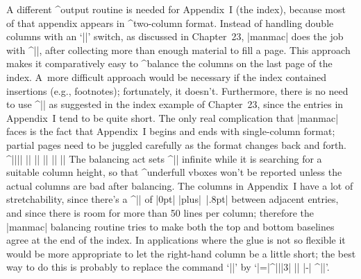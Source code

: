 A different ^{output routine} is needed for Appendix~I (the index), because
most of that appendix appears in ^{two-column format}. Instead of handling
double columns with an `|\lr|' switch, as discussed in Chapter~23,
|manmac| does the job with ^|\vsplit|, after collecting more than
enough material to fill a page. This approach makes it comparatively
easy to ^{balance the columns} on the last page of the index. A~more
difficult approach would be necessary if the index contained
insertions (e.g., footnotes); fortunately, it doesn't.
Furthermore, there is no need to use ^|\mark| as suggested in the
index example of Chapter~23, since the entries in Appendix~I tend to
be quite short. The only real complication that |manmac| faces
is the fact that Appendix~I begins and ends with single-column format;
partial pages need to be juggled carefully as the format changes back and forth.
\beginlines
^|\newbox||\partialpage|
|\def\begindoublecolumns{\begingroup|
|  \output={\global\setbox\partialpage=\vbox{\unvbox255\bigskip}}\eject|
|  \output={\doublecolumnout} |^|\hsize||=14pc |^|\vsize||=89pc}|
|\def\enddoublecolumns{\output={\balancecolumns}\eject|
|  \endgroup \pagegoal=\vsize}|
\smallbreak
|\def\doublecolumnout{\splittopskip=\topskip |^|\splitmaxdepth||=\maxdepth|
|  \dimen@=44pc \advance\dimen@ by-\ht\partialpage|
|  \setbox0=\vsplit255 to\dimen@ \setbox2=\vsplit255 to\dimen@|
|  \onepageout\pagesofar \unvbox255 \penalty|^|\outputpenalty||}|
|\def\pagesofar{\unvbox\partialpage|
|  |^|\wd||0=\hsize \wd2=\hsize \hbox to\pagewidth{\box0\hfil\box2}}|
|\def\balancecolumns{\setbox0=\vbox{\unvbox255} \dimen@=\ht0|
|  \advance\dimen@ by\topskip \advance\dimen@ by-\baselineskip|
|  |^|\divide||\dimen@ by2 |^|\splittopskip||=\topskip|
|  {\vbadness=10000 |^|\loop|| \global\setbox3=\copy0|
|    \global\setbox1=\vsplit3 to\dimen@|
|    |^|\ifdim|^|\ht||3>\dimen@ \global\advance\dimen@ by1pt \repeat}|
|  \setbox0=\vbox to\dimen@{\unvbox1} \setbox2=\vbox to\dimen@{\unvbox3}|
|  \pagesofar}|
\endlines
The balancing act sets ^|\vbadness| infinite while it is searching for
a suitable column height, so that ^{underfull} vboxes won't be reported
unless the actual columns are bad after balancing. The columns in Appendix~I
have a lot of stretchability, since there's a ^|\parskip|
of |0pt| |plus|~|.8pt| between adjacent entries, and since there is room for
more than 50 lines per column; therefore the |manmac| balancing routine tries
to make both the top and bottom baselines agree at the end of the index.
In applications where the glue is not so flexible it would be more
appropriate to let the right-hand column be a little short; the best
way to do this is probably to replace the command `||' by
`|=|^|\dp||3| || |\kern-| ^|\vfil|'.

